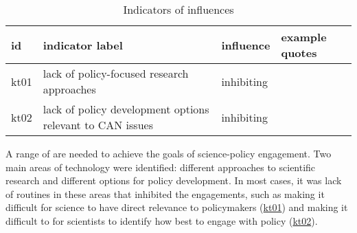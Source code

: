 \begin{table}[!ht]
\footnotesize
\caption{Indicators of \skitech{} influences}\label{tab:resskitech}
\begin{tabular}{L{.07\linewidth}L{.3\linewidth}L{.11\linewidth}L{.52\linewidth}} \hline
\textbf{id} & \textbf{indicator label} & \textbf{influence} & \textbf{example quotes} \\ \hline \hline 
kt01 & lack of policy-focused research approaches & inhibiting &  \\[5mm]
kt02 & lack of policy development options relevant to CAN issues & inhibiting &  \\[5mm]
\hline
\end{tabular}
\end{table}

A range of \skitech{} are needed to achieve the goals of science-policy engagement. Two main areas of technology were identified: different approaches to scientific research and different options for policy development. In most cases, it was lack of routines in these areas that inhibited the engagements, such as making it difficult for science to have direct relevance to policymakers (\hyperref[tab:resskitech]{kt01}) and making it difficult to for scientists to identify how best to engage with policy (\hyperref[tab:resskitech]{kt02}).

